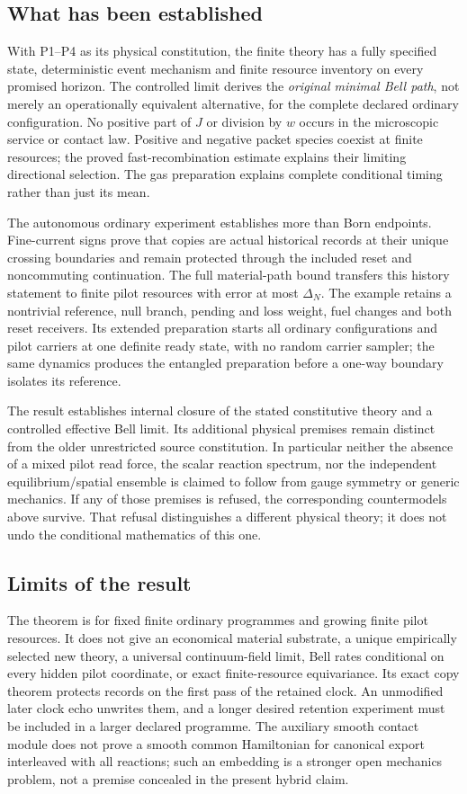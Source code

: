 \documentclass[11pt]{article}
\theoremstyle{definition}\newtheorem{definition}[theorem]{Definition}
\theoremstyle{remark}\newtheorem{remark}[theorem]{Remark}
\begin{document}
\subsection{What has been established}
With P1--P4 as its physical constitution, the finite theory has a fully specified state, deterministic event mechanism and finite resource inventory on every promised horizon. The controlled limit derives the \emph{original minimal Bell path}, not merely an operationally equivalent alternative, for the complete declared ordinary configuration. No positive part of $J$ or division by $w$ occurs in the microscopic service or contact law. Positive and negative packet species coexist at finite resources; the proved fast-recombination estimate explains their limiting directional selection. The gas preparation explains complete conditional timing rather than just its mean.

The autonomous ordinary experiment establishes more than Born endpoints. Fine-current signs prove that copies are actual historical records at their unique crossing boundaries and remain protected through the included reset and noncommuting continuation. The full material-path bound transfers this history statement to finite pilot resources with error at most $\Delta_N$. The example retains a nontrivial reference, null branch, pending and loss weight, fuel changes and both reset receivers. Its extended preparation starts all ordinary configurations and pilot carriers at one definite ready state, with no random carrier sampler; the same dynamics produces the entangled preparation before a one-way boundary isolates its reference.

The result establishes internal closure of the stated constitutive theory and a controlled effective Bell limit. Its additional physical premises remain distinct from the older unrestricted source constitution. In particular neither the absence of a mixed pilot read force, the scalar reaction spectrum, nor the independent equilibrium/spatial ensemble is claimed to follow from gauge symmetry or generic mechanics. If any of those premises is refused, the corresponding countermodels above survive. That refusal distinguishes a different physical theory; it does not undo the conditional mathematics of this one.

\subsection{Limits of the result}
The theorem is for fixed finite ordinary programmes and growing finite pilot resources. It does not give an economical material substrate, a unique empirically selected new theory, a universal continuum-field limit, Bell rates conditional on every hidden pilot coordinate, or exact finite-resource equivariance. Its exact copy theorem protects records on the first pass of the retained clock. An unmodified later clock echo unwrites them, and a longer desired retention experiment must be included in a larger declared programme. The auxiliary smooth contact module does not prove a smooth common Hamiltonian for canonical export interleaved with all reactions; such an embedding is a stronger open mechanics problem, not a premise concealed in the present hybrid claim.
\end{document}
